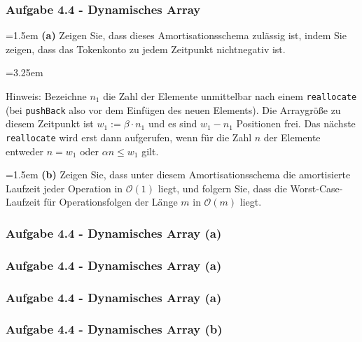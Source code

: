 \documentclass{beamer}
\begin{document}
\begin{frame}
	\frametitle{Aufgabe 4.4 - Dynamisches Array}

	\begin{small}

		\hangindent=1.5em
		\textbf{(a)} Zeigen Sie, dass dieses Amortisationsschema zulässig ist, indem Sie zeigen, dass das
		Tokenkonto zu jedem Zeitpunkt nichtnegativ ist.

		\hangindent=3.25em
		\begin{scriptsize}
			Hinweis: Bezeichne $n_1$ die Zahl der Elemente unmittelbar nach einem \texttt{reallocate} (bei \texttt{pushBack} also vor dem Einfügen des neuen Elements).
			Die Arraygröße zu diesem Zeitpunkt ist $w_1 := \beta \cdot n_1$ und es sind $w_1 - n_1$ Positionen frei.
			Das nächste \texttt{reallocate} wird erst dann aufgerufen, wenn für die Zahl $n$ der Elemente entweder $n = w_1$ oder $\alpha n \leq w_1$ gilt.
		\end{scriptsize}

		\bigskip

		\hangindent=1.5em
		\textbf{(b)} Zeigen Sie, dass unter diesem Amortisationsschema die amortisierte Laufzeit jeder Operation in $\mathcal{O}(1)$ liegt, und folgern Sie, dass die Worst-Case-Laufzeit für Operationsfolgen der Länge $m$ in $\mathcal{O}(m)$ liegt.

	\end{small}
\end{frame}

\begin{frame}
	\frametitle{Aufgabe 4.4 - Dynamisches Array (a)}
\end{frame}

\begin{frame}
	\frametitle{Aufgabe 4.4 - Dynamisches Array (a)}
\end{frame}

\begin{frame}
	\frametitle{Aufgabe 4.4 - Dynamisches Array (a)}
\end{frame}

\begin{frame}
	\frametitle{Aufgabe 4.4 - Dynamisches Array (b)}
\end{frame}
\end{document}

